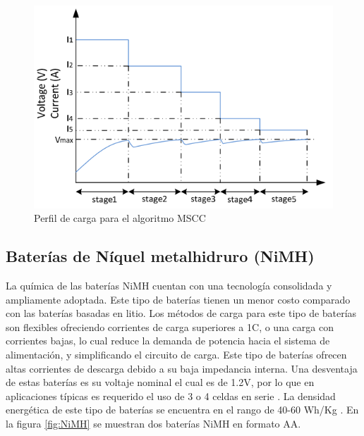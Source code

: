 \begin{figure}[H]
   \centering
   \includegraphics[scale=.75]{imagenes/perfil de carga multietapa.png}
   \caption{Perfil de carga para el algoritmo MSCC \cite{shen_charging_2012}}
   \label{fig:MSCC}
\end{figure}


\subsection*{Baterías de Níquel metalhidruro (NiMH)}

La química de las baterías NiMH cuentan con una tecnología consolidada y ampliamente adoptada. Este tipo de baterías
tienen un menor costo comparado con las baterías basadas en litio. Los métodos de carga para este tipo de baterías son
flexibles ofreciendo corrientes de carga superiores a 1C, o una carga con corrientes bajas, lo cual reduce la demanda
de potencia hacia el sistema de alimentación, y simplificando el circuito de carga. Este tipo de baterías ofrecen altas
corrientes de descarga debido a su baja impedancia interna. Una desventaja de estas baterías es su voltaje nominal 
el cual es de 1.2V, por lo que en aplicaciones típicas es requerido el uso de 3 o 4 celdas en serie
 \cite{texas_instrumens_multi-chemistry_2022}. La densidad energética de este tipo de baterías se encuentra en el 
 rango de 40-60 Wh/Kg \cite{zhan_characteristics_1999}. En la figura \ref{fig:NiMH} se muestran dos baterías NiMH
 en formato AA.


